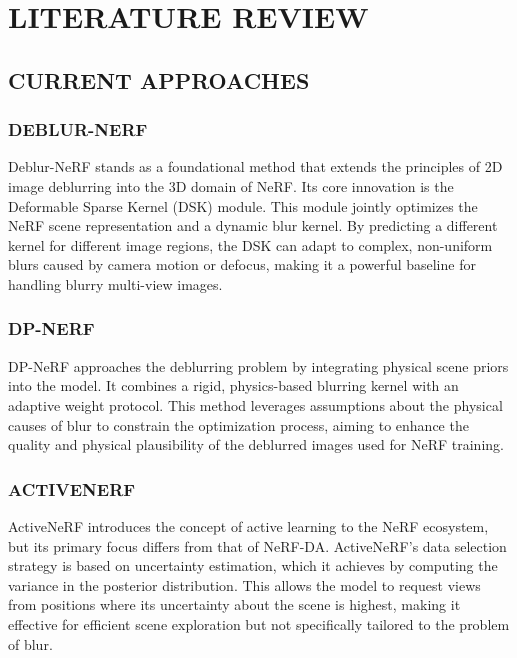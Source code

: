 \chapter{\MakeUppercase{Literature Review}}
\setcounter{equation}{0}

\section{\MakeUppercase{Current Approaches}}

\subsection{\MakeUppercase{Deblur-NeRF}}
Deblur-NeRF stands as a foundational method that extends the principles of 2D image deblurring into the 3D domain of NeRF. Its core innovation is the Deformable Sparse Kernel (DSK) module. This module jointly optimizes the NeRF scene representation and a dynamic blur kernel. By predicting a different kernel for different image regions, the DSK can adapt to complex, non-uniform blurs caused by camera motion or defocus, making it a powerful baseline for handling blurry multi-view images.\cite{bib3}

\subsection{\MakeUppercase{DP-NeRF}}
DP-NeRF approaches the deblurring problem by integrating physical scene priors into the model. It combines a rigid, physics-based blurring kernel with an adaptive weight protocol. This method leverages assumptions about the physical causes of blur to constrain the optimization process, aiming to enhance the quality and physical plausibility of the deblurred images used for NeRF training.

\subsection{\MakeUppercase{ActiveNeRF}}
ActiveNeRF introduces the concept of active learning to the NeRF ecosystem, but its primary focus differs from that of NeRF-DA. ActiveNeRF's data selection strategy is based on uncertainty estimation, which it achieves by computing the variance in the posterior distribution. This allows the model to request views from positions where its uncertainty about the scene is highest, making it effective for efficient scene exploration but not specifically tailored to the problem of blur.

